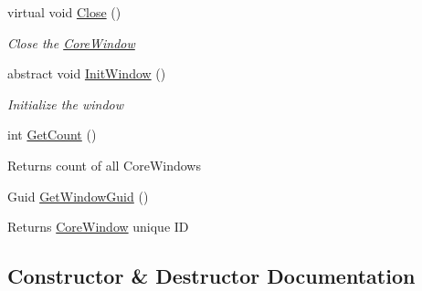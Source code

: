 \begin{DoxyCompactItemize}
virtual void \mbox{\hyperlink{class_space_v_i_l_1_1_core_window_ab69ce6562a17e23166fedb8f3ce12fc1}{Close}} ()
\begin{DoxyCompactList}\small\item\em Close the \mbox{\hyperlink{class_space_v_i_l_1_1_core_window}{Core\+Window}} \end{DoxyCompactList}\item 
abstract void \mbox{\hyperlink{class_space_v_i_l_1_1_core_window_aa3cf4ac54d9651b1149584dc81042824}{Init\+Window}} ()
\begin{DoxyCompactList}\small\item\em Initialize the window \end{DoxyCompactList}\item 
\mbox{\label{class_space_v_i_l_1_1_core_window_ab2dfb1898786db2f0f5e3e8ab9c16740}} 
int \mbox{\hyperlink{class_space_v_i_l_1_1_core_window_ab2dfb1898786db2f0f5e3e8ab9c16740}{Get\+Count}} ()
\begin{DoxyCompactList}\small\item\em \begin{DoxyReturn}{Returns}
count of all Core\+Windows 
\end{DoxyReturn}
\end{DoxyCompactList}\item 
\mbox{\label{class_space_v_i_l_1_1_core_window_a04760976a0d65dace0718bfb50a6a6ba}} 
Guid \mbox{\hyperlink{class_space_v_i_l_1_1_core_window_a04760976a0d65dace0718bfb50a6a6ba}{Get\+Window\+Guid}} ()
\begin{DoxyCompactList}\small\item\em \begin{DoxyReturn}{Returns}
\mbox{\hyperlink{class_space_v_i_l_1_1_core_window}{Core\+Window}} unique ID 
\end{DoxyReturn}
\end{DoxyCompactList}\end{DoxyCompactItemize}


\subsection{Constructor \& Destructor Documentation}
\mbox{\label{class_space_v_i_l_1_1_core_window_a49cb7bafc382c7d12250676e20c3327b}} 
